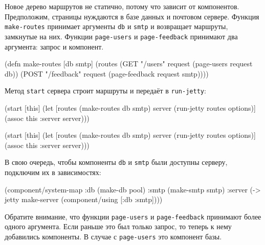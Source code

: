 \fi

Новое дерево маршрутов не статично, потому что зависит от компонентов.
Предположим, страницы нуждаются в базе данных и почтовом сервере.  Функция
\verb|make-routes| принимает аргументы \verb|db| и \verb|smtp| и возвращает
маршруты, замкнутые на них. Функции \verb|page-users| и \verb|page-feedback|
принимают два аргумента: запрос и компонент.

\begin{english}
  \begin{clojure}
(defn make-routes [db smtp]
  (routes
   (GET "/users" request
      (page-users request db))
   (POST "/feedback" request
      (page-feedback request smtp))))
  \end{clojure}
\end{english}

\noindent
Метод \verb|start| сервера строит маршруты и передаёт в \verb|run-jetty|:

\ifnarrow

\begin{english}
  \begin{clojure}
(start [this]
  (let [routes (make-routes db smtp)
        server (run-jetty
                 routes options)]
    (assoc this :server server)))
  \end{clojure}
\end{english}

\else

\begin{english}
  \begin{clojure}
(start [this]
  (let [routes (make-routes db smtp)
        server (run-jetty routes options)]
    (assoc this :server server)))
  \end{clojure}
\end{english}

\fi

В свою очередь, чтобы компоненты \verb|db| и \verb|smtp| были доступны серверу,
подключим их в зависимостях:

\begin{english}
  \begin{clojure}
(component/system-map
 :db   (make-db pool)
 :smtp (make-smtp smtp)
 :server
 (-> jetty
     make-server
     (component/using [:db :smtp])))
  \end{clojure}
\end{english}

Обратите внимание, что функции \verb|page-users| и \verb|page-feedback|
принимают более одного аргумента. Если раньше это был только запрос, то теперь к
нему добавились компоненты. В случае с \verb|page-users| это компонент базы.

